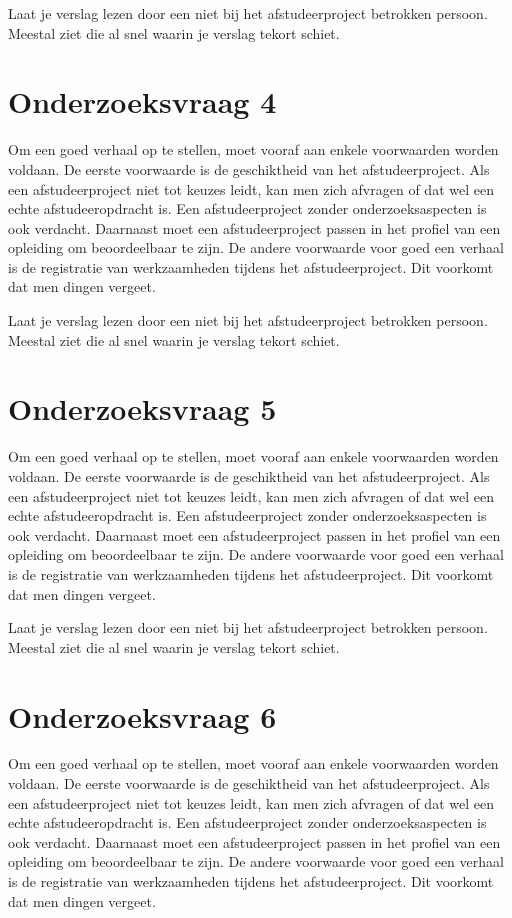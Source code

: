 		
		Laat je verslag lezen door een niet bij het afstudeerproject betrokken
		persoon. Meestal ziet die al snel waarin je verslag tekort schiet.
		\section{Onderzoeksvraag 4 }
		Om een goed verhaal op te stellen, moet vooraf aan enkele voorwaarden
		worden voldaan. De eerste voorwaarde is de geschiktheid van het
		afstudeerproject. Als een afstudeerproject niet tot keuzes leidt, kan
		men zich afvragen of dat wel een echte afstudeeropdracht is. Een
		afstudeerproject zonder onderzoeksaspecten is ook verdacht. Daarnaast
		moet een afstudeerproject passen in het profiel van een opleiding om
		beoordeelbaar te zijn. De andere voorwaarde voor goed een verhaal is
		de registratie van werkzaamheden tijdens het afstudeerproject. Dit
		voorkomt dat men dingen vergeet.
		
		
		Laat je verslag lezen door een niet bij het afstudeerproject betrokken
		persoon. Meestal ziet die al snel waarin je verslag tekort schiet.
		\section{Onderzoeksvraag 5 }
		Om een goed verhaal op te stellen, moet vooraf aan enkele voorwaarden
		worden voldaan. De eerste voorwaarde is de geschiktheid van het
		afstudeerproject. Als een afstudeerproject niet tot keuzes leidt, kan
		men zich afvragen of dat wel een echte afstudeeropdracht is. Een
		afstudeerproject zonder onderzoeksaspecten is ook verdacht. Daarnaast
		moet een afstudeerproject passen in het profiel van een opleiding om
		beoordeelbaar te zijn. De andere voorwaarde voor goed een verhaal is
		de registratie van werkzaamheden tijdens het afstudeerproject. Dit
		voorkomt dat men dingen vergeet.
		
		
		Laat je verslag lezen door een niet bij het afstudeerproject betrokken
		persoon. Meestal ziet die al snel waarin je verslag tekort schiet.
		\section{Onderzoeksvraag 6 }
		Om een goed verhaal op te stellen, moet vooraf aan enkele voorwaarden
		worden voldaan. De eerste voorwaarde is de geschiktheid van het
		afstudeerproject. Als een afstudeerproject niet tot keuzes leidt, kan
		men zich afvragen of dat wel een echte afstudeeropdracht is. Een
		afstudeerproject zonder onderzoeksaspecten is ook verdacht. Daarnaast
		moet een afstudeerproject passen in het profiel van een opleiding om
		beoordeelbaar te zijn. De andere voorwaarde voor goed een verhaal is
		de registratie van werkzaamheden tijdens het afstudeerproject. Dit
		voorkomt dat men dingen vergeet.
		
